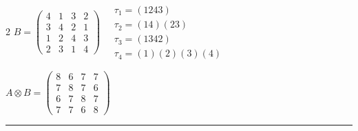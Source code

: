 \begin{multicols}{2}
$B = \begin{pmatrix} 4 & 1 & 3 & 2 \\ 3 & 4 & 2 & 1 \\ 1 & 2 & 4 & 3 \\ 2 & 3 & 1 & 4 \end{pmatrix} \quad \begin{matrix} \tau_{1}=(1 2 4 3) \\ \tau_{2}=(1 4)(2 3) \\ \tau_{3}=(1 3 4 2) \\ \tau_{4}=(1)(2)(3)(4) \end{matrix}$

$A \otimes B = \begin{pmatrix} 8 & 6 & 7 & 7 \\ 7 & 8 & 7 & 6 \\ 6 & 7 & 8 & 7 \\ 7 & 7 & 6 & 8 \end{pmatrix}$

\vspace{0.3em}
\hrule
\vspace{0.3em}

\end{multicols}